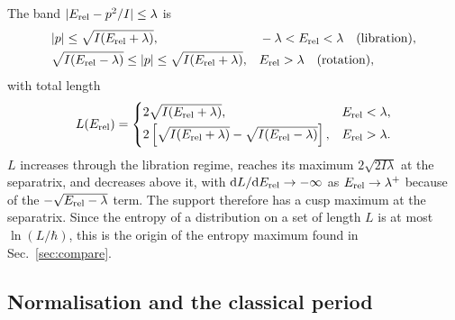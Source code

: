 \documentclass[preprint,12pt]{elsarticle}
\newcommand{\dd}{\mathrm{d}}
\newcommand{\Erel}{E_{\rm rel}}
\begin{document}
The band $|\Erel-p^{2}/I|\le\lambda$ is
\begin{equation}
\begin{aligned}
&|p|\le\sqrt{I(\Erel+\lambda)}, &&-\lambda<\Erel<\lambda\quad\text{(libration)},\\
&\sqrt{I(\Erel-\lambda)}\le|p|\le\sqrt{I(\Erel+\lambda)}, &&\Erel>\lambda
\quad\text{(rotation)},
\end{aligned}
\end{equation}
with total length
\begin{equation}
L(\Erel)=\begin{cases}2\sqrt{I(\Erel+\lambda)}, & \Erel<\lambda,\\[2pt]
2\left[\sqrt{I(\Erel+\lambda)}-\sqrt{I(\Erel-\lambda)}\right], & \Erel>\lambda .
\end{cases}
\label{eq:support}
\end{equation}
$L$ increases through the libration regime, reaches its maximum
$2\sqrt{2I\lambda}$ at the separatrix, and decreases above it, with
$\dd L/\dd\Erel\to-\infty$ as $\Erel\to\lambda^{+}$ because of the
$-\sqrt{\Erel-\lambda}$ term. The support therefore has a cusp maximum at the
separatrix. Since the entropy of a distribution on a set of length $L$ is at
most $\ln(L/\hbar)$, this is the origin of the entropy maximum found in
Sec.~\ref{sec:compare}.

\subsection{Normalisation and the classical period}
\end{document}
